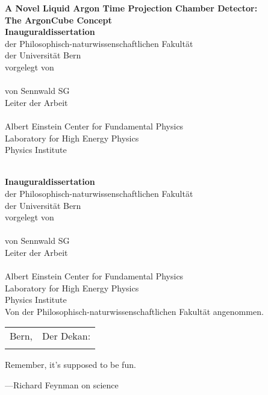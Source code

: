\begin{titlepage}
	\begin{center}
		\null
		\vfill
		\textbf{\LARGE A Novel Liquid Argon Time Projection Chamber Detector:}\\[3mm]
		\textbf{\LARGE The ArgonCube Concept}\\[20mm]
		\textbf{\large Inauguraldissertation}\\
		{\large der Philosophisch-naturwissenschaftlichen Fakultät}\\
		{\large der Universität Bern}\\[20mm]
		{\large vorgelegt von}\\[10mm]
		\textbf{\Large\Author}\\[10mm]
		{\large von Sennwald SG}\\[20mm]
		{\large Leiter der Arbeit}\\
		\textbf{\large\Supervisor}\\[10mm]
		{\large Albert Einstein Center for Fundamental Physics}\\
		{\large Laboratory for High Energy Physics}\\
		{\large Physics Institute}\\
		\vfill
	\end{center}
\end{titlepage}
\cleardoublepage
\begin{titlepage}
	\begin{center}
		\null
		\vfill
		\textbf{\LARGE\Title}\\[20mm]
		\textbf{\large Inauguraldissertation}\\
		{\large der Philosophisch-naturwissenschaftlichen Fakultät}\\
		{\large der Universität Bern}\\[20mm]
		{\large vorgelegt von}\\[10mm]
		\textbf{\Large\Author}\\[10mm]
		{\large von Sennwald SG}\\[20mm]
		{\large Leiter der Arbeit}\\
		\textbf{\large\Supervisor}\\[10mm]
		{\large Albert Einstein Center for Fundamental Physics}\\
		{\large Laboratory for High Energy Physics}\\
		{\large Physics Institute}\\[10mm]
		{\large Von der Philosophisch-naturwissenschaftlichen Fakultät angenommen.}\\[10mm]
		\begin{tabular}{p{8cm}l}
			{\large Bern, \Date} &	{\large Der Dekan:} \\
			&						{\large\Dean}
		\end{tabular}
		\vfill
	\end{center}
\end{titlepage}
\cleardoublepage
\thispagestyle{empty}
Remember, it's supposed to be fun.

\bigskip

---Richard Feynman on science
\cleardoublepage